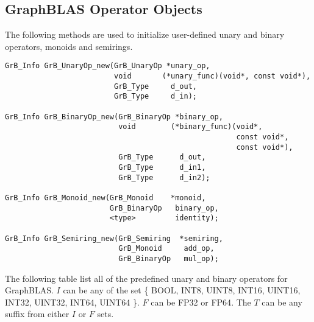 \documentclass[11pt]{article}
\begin{document}
\subsection{GraphBLAS Operator Objects}

The following methods are used to initialize user-defined unary and binary operators, monoids and semirings.

\begin{verbatim}
GrB_Info GrB_UnaryOp_new(GrB_UnaryOp *unary_op,
                         void       (*unary_func)(void*, const void*),
                         GrB_Type     d_out,
                         GrB_Type     d_in);
                         
GrB_Info GrB_BinaryOp_new(GrB_BinaryOp *binary_op,
                          void        (*binary_func)(void*,
                                                     const void*,
                                                     const void*),
                          GrB_Type      d_out,
                          GrB_Type      d_in1,
                          GrB_Type      d_in2);

GrB_Info GrB_Monoid_new(GrB_Monoid    *monoid,
                        GrB_BinaryOp   binary_op,
                        <type>         identity);

GrB_Info GrB_Semiring_new(GrB_Semiring  *semiring,
                          GrB_Monoid     add_op,
                          GrB_BinaryOp   mul_op);
\end{verbatim}
                

The following table list all of the predefined unary and binary operators for 
GraphBLAS. $I$ can be any of the set \{ {\sf BOOL, INT8, UINT8, INT16, 
UINT16, INT32, UINT32, INT64, UINT64} \}. $F$ can be {\sf FP32} or {\sf FP64}.
The $T$ can be any suffix from either $I$ or $F$ sets.
\end{document}
